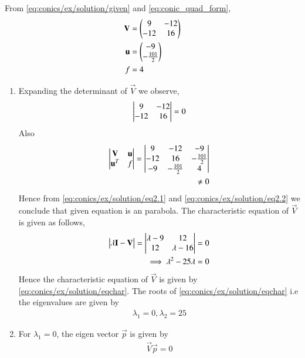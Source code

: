 From \eqref{eq:conics/ex/solution/given} and \eqref{eq:conic_quad_form},
%
\begin{align}
\mathbf{V} &= \begin{pmatrix}9&-12\\-12&16\end{pmatrix}\\ \label{eq:conics/ex/solution/given1}
\mathbf{u} &= \begin{pmatrix}-9\\-\frac{101}{2}\end{pmatrix}\\ 
f &= 4 \label{eq:conics/ex/solution/given2}
\end{align}
\begin{enumerate}
\item Expanding the determinant of $\vec{V}$ we observe, 
\begin{align}
\begin{vmatrix}9&-12\\-12&16\end{vmatrix} = 0 \label{eq:conics/ex/solution/eq2.1}
\end{align}
Also
\begin{align}
    \begin{vmatrix}\mathbf{V} & \mathbf{u} \\ \mathbf{u}^T & f\end{vmatrix}=
    \begin{vmatrix}9&-12 & -9 \\-12&16 & -\frac{101}{2} \\ -9 & -\frac{101}{2} & 4\end{vmatrix} \\
    \neq 0\label{eq:conics/ex/solution/eq2.2}
\end{align}
Hence from \eqref{eq:conics/ex/solution/eq2.1} and \eqref{eq:conics/ex/solution/eq2.2} we conclude that given equation is an parabola. The characteristic equation of $\vec{V}$ is given as follows,
\begin{align}
\begin{vmatrix}\lambda\mathbf{I}-\mathbf{V}\end{vmatrix} = \begin{vmatrix}\lambda-9&12\\12&\lambda-16\end{vmatrix} &= 0\\
\implies \lambda^2-25\lambda &= 0\label{eq:conics/ex/solution/eqchar}
\end{align}
Hence the characteristic equation of $\vec{V}$ is given by \eqref{eq:conics/ex/solution/eqchar}. The roots of \eqref{eq:conics/ex/solution/eqchar} i.e the eigenvalues are given by
\begin{align}
\lambda_1=0, \lambda_2=25\label{eq:conics/ex/solution/eqeigenvals}    
\end{align}
\item For $\lambda_1 = 0$, the eigen vector $\vec{p}$ is given by 
\begin{align}
\vec{V}\vec{p} = 0

\end{align}
\end{enumerate}
